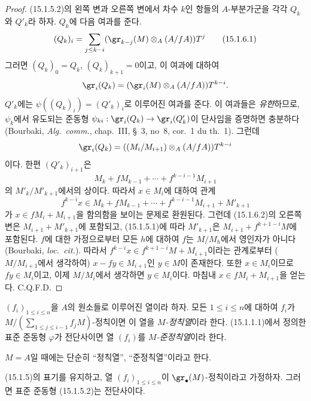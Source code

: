 \begin{proof}
(15.1.5.2)의 왼쪽 변과 오른쪽 변에서 차수 $k$인 항들의 $A$-부분가군을
각각 $Q_k$와 $Q'_k$라 하자. $Q_k$에 다음 여과를 준다.
\[
  (Q_k)_i=\sum_{j\leq k-i}
  (\gr_{k-j}(M)\otimes_A(A/fA))T^j
  \tag{15.1.6.1}\label{0.15.1.6.1-fr}
\]
그러면 $(Q_k)_0=Q_k$, $(Q_k)_{k+1}=0$이고, 이 여과에 대하여
\[
  \gr_i(Q_k)=(\gr_i(M)\otimes_A(A/fA))T^{k-i}.
\]
$Q'_k$에는 $\psi((Q_k)_i)=(Q'_k)_i$로 이루어진 여과를 준다. 이
여과들은 \emph{유한}하므로, $\psi_k$에서 유도되는 준동형
$\psi_{ki}:\gr_i(Q_k)\to\gr_i(Q'_k)$이 단사임을 증명하면 충분하다
(Bourbaki, \emph{Alg.~comm.}, chap.~III, \S~3, no~8, cor.~1 du th.~1).
그런데
\[
  \gr_i(Q_k)=((M_i/M_{i+1})\otimes_A(A/fA))T^{k-i}
\]
이다. 한편 $(Q'_k)_{i+1}$은
\[
  M_k+fM_{k-1}+\cdots+f^{k-i-1}M_{i+1}
\]
의 $M'_k/M'_{k+1}$에서의 상이다. 따라서 $x\in M_i$에 대하여 관계
\[
  f^{k-i}x\in M_k+fM_{k-1}+\cdots+
  f^{k-i-1}M_{i+1}+M'_{k+1}
  \tag{15.1.6.2}\label{0.15.1.6.2-fr}
\]
가 $x\in fM_i+M_{i+1}$을 함의함을 보이는 문제로 환원된다. 그런데
(15.1.6.2)의 오른쪽 변은 $M_{i+1}+M'_{k+1}$에 포함되고,
(15.1.5.1)에 따라 $M'_{k+1}$은 $M_{i+1}+f^{k+1-i}M$에 포함된다.
$f$에 대한 가정으로부터 모든 $h$에 대하여 $f$는 $M/M_h$에서
영인자가 아니다 (Bourbaki, \emph{loc.~cit.}). 따라서
$f^{k-i}x\in f^{k+1-i}M+M_{i+1}$이라는 관계로부터
($M/M_{i+1}$에서 생각하여) $x-fy\in M_{i+1}$인 $y\in M$이 존재한다.
또한 $x\in M_i$이므로 $fy\in M_i$이고, 이제 $M/M_i$에서 생각하면
$y\in M_i$이다. 마침내 $x\in fM_i+M_{i+1}$을 얻는다. C.Q.F.D.
\end{proof}

\begin{definition}[15.1.7]
\label{0.15.1.7-fr}
$(f_i)_{1\leq i\leq n}$을 $A$의 원소들로 이루어진 열이라 하자. 모든
$1\leq i\leq n$에 대하여 $f_i$가
$M/(\sum_{1\leq j\leq i-1}f_jM)$-정칙이면 이 열을
\emph{$M$-정칙열}이라 한다. (15.1.1.1)에서 정의한 표준 준동형
$\varphi$가 전단사이면 열 $(f_i)$를 \emph{$M$-준정칙열}이라 한다.

$M=A$일 때에는 단순히 “정칙열”, “준정칙열”이라고 한다.
\end{definition}

\begin{proposition}[15.1.8]
\label{0.15.1.8-fr}
(15.1.5)의 표기를 유지하고, 열 $(f_i)_{1\leq i\leq n}$이
$\gr_\bullet(M)$-정칙이라고 가정하자. 그러면 표준 준동형 (15.1.5.2)는
전단사이다.
\end{proposition}

